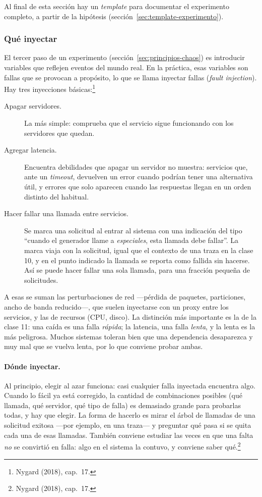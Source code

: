 \documentclass[variant=apuntes,cover=institutional,mode=screen]{ua-engineering-v6-article}
\begin{document}
Al final de esta sección hay un \emph{template} para documentar el experimento completo, a partir de la hipótesis (sección~\ref{sec:template-experimento}).

\subsubsection{Qué inyectar}

El tercer paso de un experimento (sección~\ref{sec:principios-chaos}) es introducir variables que reflejen eventos del mundo real. En la práctica, esas variables son fallas que se provocan a propósito, lo que se llama inyectar fallas (\emph{fault injection}). Hay tres inyecciones básicas:\footnote{Nygard (2018), cap.~17.}
\begin{description}
\item[Apagar servidores.] La más simple: comprueba que el servicio sigue funcionando con los servidores que quedan.
\item[Agregar latencia.] Encuentra debilidades que apagar un servidor no muestra: servicios que, ante un \emph{timeout}, devuelven un error cuando podrían tener una alternativa útil, y errores que solo aparecen cuando las respuestas llegan en un orden distinto del habitual.
\item[Hacer fallar una llamada entre servicios.] Se marca una solicitud al entrar al sistema con una indicación del tipo ``cuando el generador llame a \emph{especiales}, esta llamada debe fallar''. La marca viaja con la solicitud, igual que el contexto de una traza en la clase 10, y en el punto indicado la llamada se reporta como fallida sin hacerse. Así se puede hacer fallar una sola llamada, para una fracción pequeña de solicitudes.
\end{description}

A esas se suman las perturbaciones de red ---pérdida de paquetes, particiones, ancho de banda reducido---, que suelen inyectarse con un proxy entre los servicios, y las de recursos (CPU, disco). La distinción más importante es la de la clase 11: una caída es una falla \emph{rápida}; la latencia, una falla \emph{lenta}, y la lenta es la más peligrosa. Muchos sistemas toleran bien que una dependencia desaparezca y muy mal que se vuelva lenta, por lo que conviene probar ambas.

\paragraph{Dónde inyectar.} Al principio, elegir al azar funciona: casi cualquier falla inyectada encuentra algo. Cuando lo fácil ya está corregido, la cantidad de combinaciones posibles (qué llamada, qué servidor, qué tipo de falla) es demasiado grande para probarlas todas, y hay que elegir. La forma de hacerlo es mirar el árbol de llamadas de una solicitud exitosa ---por ejemplo, en una traza--- y preguntar qué pasa si se quita cada una de esas llamadas. También conviene estudiar las veces en que una falta \emph{no} se convirtió en falla: algo en el sistema la contuvo, y conviene saber qué.\footnote{Nygard (2018), cap.~17.}
\end{document}

